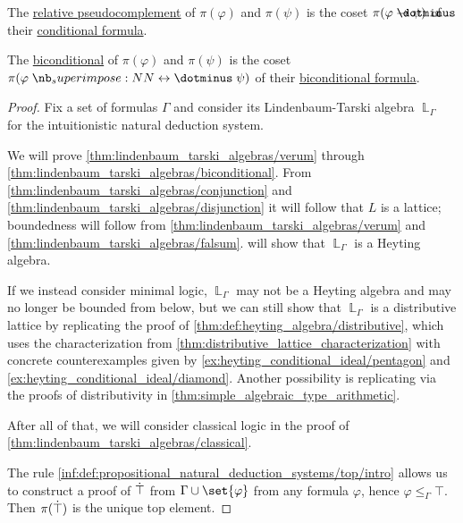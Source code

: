 \begin{proposition}
\begin{thmenum}[resume=thm:lindenbaum_tarski_algebras]
     The \hyperref[def:heyting_algebra]{relative pseudocomplement} of \( \pi(\varphi) \) and \( \pi(\psi) \) is the coset \( \pi(\varphi \synimplies \psi) \) of their \hyperref[def:propositional_alphabet/connectives/conditional]{conditional formula}.

     The \hyperref[def:heyting_algebra/biconditional]{biconditional} of \( \pi(\varphi) \) and \( \pi(\psi) \) is the coset \( \pi(\varphi \syniff \psi) \) of their \hyperref[def:propositional_alphabet/connectives/biconditional]{biconditional formula}.
  \end{thmenum}
\end{proposition}
\begin{proof}
  Fix a set of formulas \( \Gamma \) and consider its Lindenbaum-Tarski algebra \( \BbbL_\Gamma \) for the intuitionistic natural deduction system.

  We will prove \cref{thm:lindenbaum_tarski_algebras/verum} through \cref{thm:lindenbaum_tarski_algebras/biconditional}. From \cref{thm:lindenbaum_tarski_algebras/conjunction} and \cref{thm:lindenbaum_tarski_algebras/disjunction} it will follow that \( L \) is a lattice; boundedness will follow from \cref{thm:lindenbaum_tarski_algebras/verum} and \cref{thm:lindenbaum_tarski_algebras/falsum}.  will show that \( \BbbL_\Gamma \) is a Heyting algebra.

  If we instead consider minimal logic, \( \BbbL_\Gamma \) may not be a Heyting algebra and may no longer be bounded from below, but we can still show that \( \BbbL_\Gamma \) is a distributive lattice by replicating the proof of \cref{thm:def:heyting_algebra/distributive}, which uses the characterization from \cref{thm:distributive_lattice_characterization} with concrete counterexamples given by \cref{ex:heyting_conditional_ideal/pentagon} and \cref{ex:heyting_conditional_ideal/diamond}. Another possibility is replicating via  the proofs of distributivity in \cref{thm:simple_algebraic_type_arithmetic}.

  After all of that, we will consider classical logic in the proof of \cref{thm:lindenbaum_tarski_algebras/classical}.

   The rule \ref{inf:def:propositional_natural_deduction_systems/top/intro} allows us to construct a proof of \( \dot{\top} \) from \( \Gamma \cup \set{ \varphi } \) from any formula \( \varphi \), hence \( \varphi \leq_\Gamma \top \). Then \( \pi(\dot{\top}) \) is the unique top element.


\end{proof}
